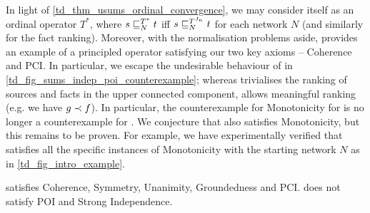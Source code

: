 In light of \cref{td_thm_usums_ordinal_convergence}, we may consider \usums{}
itself as an ordinal operator $T^*$, where $s \sqsubseteq_N^{T^*} t$ iff $s
\sqsubseteq_N^{T^{J_n}} t$ for each network $N$ (and similarly for the fact ranking).
Moreover, with the normalisation problems aside, \usums{} provides an example
of a principled operator satisfying our two key axioms -- Coherence and PCI. In
particular, we escape the undesirable behaviour of \sums{} in
\cref{td_fig_sums_indep_poi_counterexample}; whereas \sums{} trivialises the
ranking of sources and facts in the upper connected component, \usums{} allows
meaningful ranking (e.g. we have $g \prec f$). In particular, the counterexample
for Monotonicity for \sums{} is no longer a counterexample for \usums{}. We
conjecture that \usums{} also satisfies Monotonicity, but this remains to be
proven. For example, we have experimentally verified that \usums{} satisfies
all the specific instances of Monotonicity with the starting network $N$ as in
\cref{td_fig_intro_example}.

\begin{theorem}
\label{td_thm_usums_axioms}
\usums{} satisfies Coherence, Symmetry, Unanimity, Groundedness and
PCI. \usums{} does not satisfy POI and Strong Independence.
\end{theorem}

